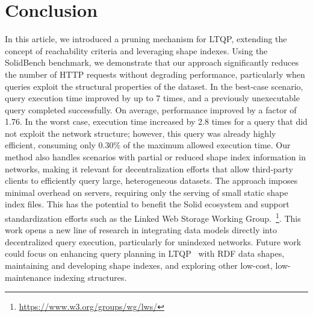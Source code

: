 \section{Conclusion}\label{sec:conclusion}

In this article, we introduced a pruning mechanism for LTQP, extending the concept of reachability criteria and leveraging shape indexes. 
Using the SolidBench benchmark, we demonstrate that our approach significantly reduces the number of HTTP requests without degrading performance, particularly when queries exploit the structural properties of the dataset.
In the best-case scenario, query execution time improved by up to 7 times, and a previously unexecutable query completed successfully.
On average, performance improved by a factor of 1.76.
In the worst case, execution time increased by 2.8 times for a query that did not exploit the network structure; however, this query was already highly efficient, consuming only 0.30\% of the maximum allowed execution time.
Our method also handles scenarios with partial or reduced shape index information in networks, making it relevant for decentralization efforts that allow third-party clients to efficiently query large, heterogeneous datasets.
The approach imposes minimal overhead on servers, requiring only the serving of small static shape index files. 
This has the potential to benefit the Solid ecosystem and support standardization efforts such as the Linked Web Storage Working Group.~\footnote{\url{https://www.w3.org/groups/wg/lws/}}.
This work opens a new line of research in integrating data models directly into decentralized query execution, particularly for unindexed networks. 
Future work could focus on enhancing query planning in LTQP~\cite{taelman2024towards} with RDF data shapes, 
maintaining and developing shape indexes, and exploring other low-cost, low-maintenance indexing structures.



